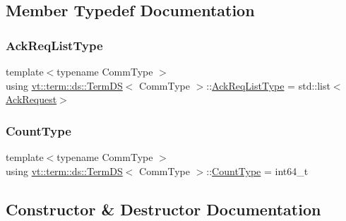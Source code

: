 \subsection{Member Typedef Documentation}
\mbox{\label{structvt_1_1term_1_1ds_1_1_term_d_s_a9d4102aa0577c3b077befc48c1a88842}} 
\subsubsection{\texorpdfstring{Ack\+Req\+List\+Type}{AckReqListType}}
{\footnotesize\ttfamily template$<$typename Comm\+Type $>$ \\
using \hyperlink{structvt_1_1term_1_1ds_1_1_term_d_s}{vt\+::term\+::ds\+::\+Term\+DS}$<$ Comm\+Type $>$\+::\hyperlink{structvt_1_1term_1_1ds_1_1_term_d_s_a9d4102aa0577c3b077befc48c1a88842}{Ack\+Req\+List\+Type} =  std\+::list$<$\hyperlink{structvt_1_1term_1_1ds_1_1_ack_request}{Ack\+Request}$>$}

\mbox{\label{structvt_1_1term_1_1ds_1_1_term_d_s_a54f4ebd7e1ecb59c32c0f5b03ef9f20b}} 
\subsubsection{\texorpdfstring{Count\+Type}{CountType}}
{\footnotesize\ttfamily template$<$typename Comm\+Type $>$ \\
using \hyperlink{structvt_1_1term_1_1ds_1_1_term_d_s}{vt\+::term\+::ds\+::\+Term\+DS}$<$ Comm\+Type $>$\+::\hyperlink{structvt_1_1term_1_1ds_1_1_term_d_s_a54f4ebd7e1ecb59c32c0f5b03ef9f20b}{Count\+Type} =  int64\+\_\+t}



\subsection{Constructor \& Destructor Documentation}
\mbox{\label{structvt_1_1term_1_1ds_1_1_term_d_s_a1873de7f6d3009bd997c64eefb46d9b5}} 
